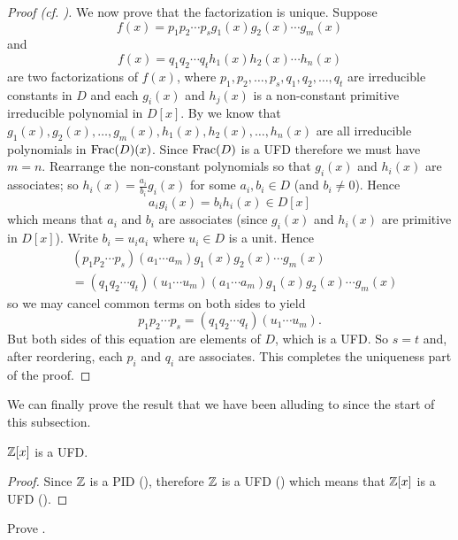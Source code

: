 \begin{proof}[Proof (cf. {\cite[Theorem 18.29]{judson_beezer_2022}})]
    We now prove that the factorization is unique. Suppose
    \[
        f(x) = p_1p_2\cdots p_s g_1(x)g_2(x) \cdots g_m(x)
    \]
    and
    \[
        f(x) = q_1q_2\cdots q_t h_1(x)h_2(x) \cdots h_n(x)
    \]
    are two factorizations of $f(x)$, where $p_1, p_2, \dots, p_s, q_1, q_2, \dots, q_t$ are irreducible constants in $D$ and each $g_i(x)$ and $h_j(x)$ is a non-constant primitive irreducible polynomial in $D[x]$. By  we know that $g_1(x), g_2(x), \dots, g_m(x), h_1(x), h_2(x), \dots, h_n(x)$ are all irreducible polynomials in $\mathrm{Frac}(D)(x)$. Since $\mathrm{Frac}(D)$ is a UFD therefore we must have $m = n$. Rearrange the non-constant polynomials so that $g_i(x)$ and $h_i(x)$ are associates; so $h_i(x) = \frac{a_i}{b_i}g_i(x)$ for some $a_i, b_i \in D$ (and $b_i \neq 0$). Hence
    \[
        a_i g_i(x) = b_i h_i(x) \in D[x]
    \]
    which means that $a_i$ and $b_i$ are associates (since $g_i(x)$ and $h_i(x)$ are primitive in $D[x]$). Write $b_i = u_ia_i$ where $u_i \in D$ is a unit. Hence
    \begin{align*}
        &(p_1p_2\cdots p_s)(a_1\cdots a_m) g_1(x)g_2(x) \cdots g_m(x)\\
        &= (q_1q_2\cdots q_t)(u_1\cdots u_m)(a_1\cdots a_m)g_1(x)g_2(x) \cdots g_m(x)
    \end{align*}
    so we may cancel common terms on both sides to yield
    \[
        p_1p_2\cdots p_s = (q_1q_2\cdots q_t)(u_1\cdots u_m).
    \]
    But both sides of this equation are elements of $D$, which is a UFD. So $s = t$ and, after reordering, each $p_i$ and $q_i$ are associates. This completes the uniqueness part of the proof.
\end{proof}

We can finally prove the result that we have been alluding to since the start of this subsection.

\begin{corollary}\label{corollary-Z-is-UFD}
    $\mathbb{Z}[x]$ is a UFD.
\end{corollary}
\begin{proof}
    Since $\mathbb{Z}$ is a PID (), therefore $\mathbb{Z}$ is a UFD () which means that $\mathbb{Z}[x]$ is a UFD ().
\end{proof}

\begin{exercise}\label{exercise-primitive-polynomial-irreducible-iff-polynomial-irreducible-in-field-of-fractions}
    Prove .
\end{exercise}

